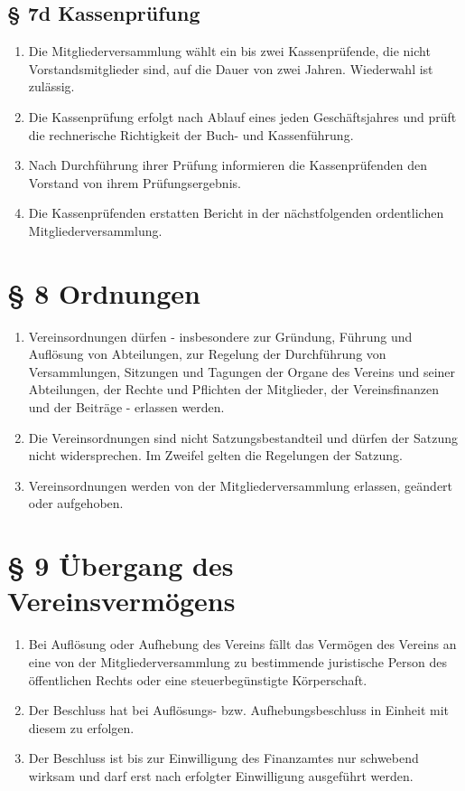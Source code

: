\documentclass[11pt,a4paper]{scrartcl}
\begin{document}
\subsection*{§ 7d Kassenprüfung}
\begin{enumerate}[label=\arabic*.]
    \item Die Mitgliederversammlung wählt ein bis zwei Kassenprüfende, die nicht Vorstandsmitglieder sind, auf die Dauer von zwei Jahren. Wiederwahl ist zulässig.
    \item Die Kassenprüfung erfolgt nach Ablauf eines jeden Geschäftsjahres und prüft die rechnerische Richtigkeit der Buch- und Kassenführung. 
    \item Nach Durchführung ihrer Prüfung informieren die Kassenprüfenden den Vorstand von ihrem Prüfungsergebnis.
    \item Die Kassenprüfenden erstatten Bericht in der nächstfolgenden ordentlichen Mitgliederversammlung.
\end{enumerate}

\section*{§ 8 Ordnungen}
\begin{enumerate}[label=\arabic*.]
    \item Vereinsordnungen dürfen - insbesondere zur Gründung, Führung und Auflösung von Abteilungen, zur Regelung der Durchführung von Versammlungen, Sitzungen und Tagungen der Organe des Vereins und seiner Abteilungen, der Rechte und Pflichten der Mitglieder, der Vereinsfinanzen und der Beiträge - erlassen werden.
    \item Die Vereinsordnungen sind nicht Satzungsbestandteil und dürfen der Satzung nicht widersprechen. Im Zweifel gelten die Regelungen der Satzung.
    \item Vereinsordnungen werden von der Mitgliederversammlung erlassen, geändert oder aufgehoben.
\end{enumerate}

\section*{§ 9 Übergang des Vereinsvermögens}
\begin{enumerate}[label=\arabic*.]
    \item Bei Auflösung oder Aufhebung des Vereins fällt das Vermögen des Vereins an eine von der Mitgliederversammlung zu bestimmende juristische Person des öffentlichen Rechts oder eine steuerbegünstigte Körperschaft.
    \item Der Beschluss hat bei Auflösungs- bzw. Aufhebungsbeschluss in Einheit mit diesem zu erfolgen.
    \item Der Beschluss ist bis zur Einwilligung des Finanzamtes nur schwebend wirksam und darf erst nach erfolgter Einwilligung ausgeführt werden.
\end{enumerate}
\end{document}
